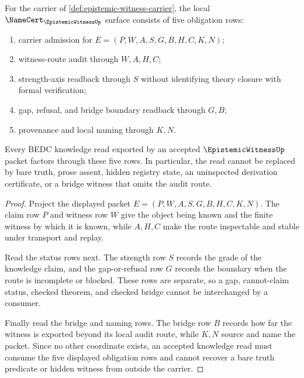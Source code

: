 \begin{theorem}
\label{thm:epistemic-witness-names-knowledge-audit}
For the carrier of \autoref{def:epistemic-witness-carrier}, the local $\NameCert_{\EpistemicWitnessUp}$ surface consists of five obligation rows:
\begin{enumerate}
\item carrier admission for $E=(P,W,A,S,G,B,H,C,K,N)$;
\item witness-route audit through $W,A,H,C$;
\item strength-axis readback through $S$ without identifying theory closure with formal verification;
\item gap, refusal, and bridge boundary readback through $G,B$;
\item provenance and local naming through $K,N$.
\end{enumerate}
Every BEDC knowledge read exported by an accepted $\EpistemicWitnessUp$ packet factors through these five rows. In particular, the read cannot be replaced by bare truth, prose assent, hidden registry state, an uninspected derivation certificate, or a bridge witness that omits the audit route.
\end{theorem}
\begin{proof}
Project the displayed packet $E=(P,W,A,S,G,B,H,C,K,N)$. The claim row $P$ and witness row $W$ give the object being known and the finite witness by which it is known, while $A,H,C$ make the route inspectable and stable under transport and replay.

Read the status rows next. The strength row $S$ records the grade of the knowledge claim, and the gap-or-refusal row $G$ records the boundary when the route is incomplete or blocked. These rows are separate, so a gap, cannot-claim status, checked theorem, and checked bridge cannot be interchanged by a consumer.

Finally read the bridge and naming rows. The bridge row $B$ records how far the witness is exported beyond its local audit route, while $K,N$ source and name the packet. Since no other coordinate exists, an accepted knowledge read must consume the five displayed obligation rows and cannot recover a bare truth predicate or hidden witness from outside the carrier.
\end{proof}


